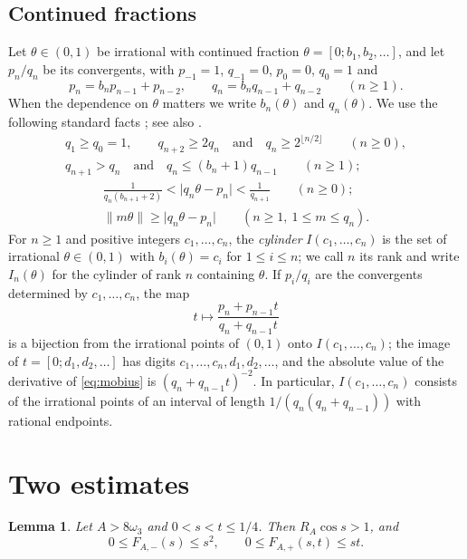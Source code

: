 \documentclass{amsart}
\newtheorem{lemma}[theorem]{Lemma}
\theoremstyle{definition}
\theoremstyle{remark}
\numberwithin{equation}{section}
\newcommand{\norm}[1]{\lVert #1 \rVert}
\begin{document}
\subsection{Continued fractions}
Let $\theta\in(0,1)$ be irrational with continued fraction $\theta=[0;b_1,b_2,\dots]$, and let $p_n/q_n$ be its convergents, with $p_{-1}=1$, $q_{-1}=0$, $p_0=0$, $q_0=1$ and
\[
p_n=b_np_{n-1}+p_{n-2},\qquad q_n=b_nq_{n-1}+q_{n-2}\qquad(n\ge1).
\]
When the dependence on $\theta$ matters we write $b_n(\theta)$ and $q_n(\theta)$. We use the following standard facts \cite{Kh}; see also \cite[Propositions~10 and 11]{HR}.
\begin{equation}\label{eq:growth}
\begin{gathered}
q_1\ge q_0=1,\qquad q_{n+2}\ge2q_n\quad\text{and}\quad q_n\ge2^{\lfloor n/2\rfloor}\qquad(n\ge0),\\
q_{n+1}>q_n\quad\text{and}\quad q_n\le(b_n+1)q_{n-1}\qquad(n\ge1);
\end{gathered}
\end{equation}
\begin{gather}
\frac{1}{q_n(b_{n+1}+2)}<\lvert q_n\theta-p_n\rvert<\frac1{q_{n+1}}\qquad(n\ge0);\label{eq:error}\\
\norm{m\theta}\ge\lvert q_n\theta-p_n\rvert\qquad(n\ge1,\ 1\le m\le q_n).\label{eq:best}
\end{gather}
For $n\ge1$ and positive integers $c_1,\dots,c_n$, the \emph{cylinder} $I(c_1,\dots,c_n)$ is the set of irrational $\theta\in(0,1)$ with $b_i(\theta)=c_i$ for $1\le i\le n$; we call $n$ its rank and write $I_n(\theta)$ for the cylinder of rank $n$ containing $\theta$. If $p_i/q_i$ are the convergents determined by $c_1,\dots,c_n$, the map
\begin{equation}\label{eq:mobius}
t\longmapsto\frac{p_n+p_{n-1}t}{q_n+q_{n-1}t}
\end{equation}
is a bijection from the irrational points of $(0,1)$ onto $I(c_1,\dots,c_n)$; the image of $t=[0;d_1,d_2,\dots]$ has digits $c_1,\dots,c_n,d_1,d_2,\dots$, and the absolute value of the derivative of \eqref{eq:mobius} is $(q_n+q_{n-1}t)^{-2}$. In particular, $I(c_1,\dots,c_n)$ consists of the irrational points of an interval of length $1/(q_n(q_n+q_{n-1}))$ with rational endpoints.

\section{Two estimates}\label{sec:estimates}

\begin{lemma}\label{lem:quadratic}
Let $A>8\omega_3$ and $0<s<t\le1/4$. Then $R_A\cos s>1$, and
\[
0\le F_{A,-}(s)\le s^2,\qquad 0\le F_{A,+}(s,t)\le st .
\]
\end{lemma}
\end{document}

